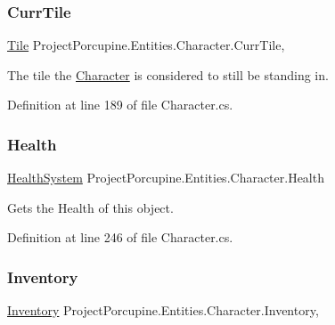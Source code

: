 \subsubsection{\texorpdfstring{Curr\+Tile}{CurrTile}}
{\footnotesize\ttfamily \hyperlink{class_tile}{Tile} Project\+Porcupine.\+Entities.\+Character.\+Curr\+Tile\hspace{0.3cm}{\ttfamily [get]}, {\ttfamily [set]}}



The tile the \hyperlink{class_project_porcupine_1_1_entities_1_1_character}{Character} is considered to still be standing in. 



Definition at line 189 of file Character.\+cs.

\mbox{\label{class_project_porcupine_1_1_entities_1_1_character_a583d507f17c0164d156f735172fab042}} 
\subsubsection{\texorpdfstring{Health}{Health}}
{\footnotesize\ttfamily \hyperlink{class_health_system}{Health\+System} Project\+Porcupine.\+Entities.\+Character.\+Health\hspace{0.3cm}{\ttfamily [get]}}



Gets the Health of this object. 



Definition at line 246 of file Character.\+cs.

\mbox{\label{class_project_porcupine_1_1_entities_1_1_character_a051d739a9db597fbcf9b089d635467f1}} 
\subsubsection{\texorpdfstring{Inventory}{Inventory}}
{\footnotesize\ttfamily \hyperlink{class_inventory}{Inventory} Project\+Porcupine.\+Entities.\+Character.\+Inventory\hspace{0.3cm}{\ttfamily [get]}, {\ttfamily [set]}}



